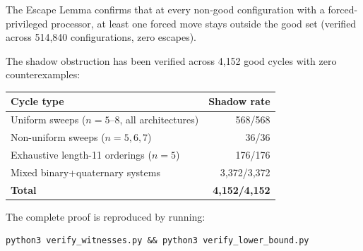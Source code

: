 \documentclass[11pt]{article}
\begin{document}
The Escape Lemma confirms that at every non-good configuration with a forced-privileged processor, at least one forced move stays outside the good set (verified across 514{,}840 configurations, zero escapes).

The shadow obstruction has been verified across 4{,}152 good cycles with zero counterexamples:
\begin{center}
\begin{tabular}{lr}
\toprule
Cycle type & Shadow rate \\
\midrule
Uniform sweeps ($n=5$--$8$, all architectures) & 568/568 \\
Non-uniform sweeps ($n=5,6,7$) & 36/36 \\
Exhaustive length-11 orderings ($n=5$) & 176/176 \\
Mixed binary+quaternary systems & 3{,}372/3{,}372 \\
\midrule
\textbf{Total} & \textbf{4{,}152/4{,}152} \\
\bottomrule
\end{tabular}
\end{center}

The complete proof is reproduced by running:
\begin{verbatim}
python3 verify_witnesses.py && python3 verify_lower_bound.py
\end{verbatim}
\end{document}
